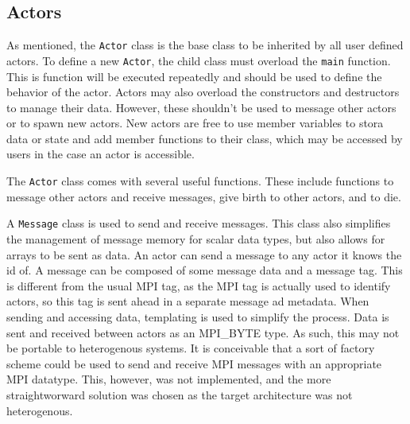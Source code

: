 \documentclass[12pt,a4paper]{article}
\newcommand{\term}[1]{\texttt{#1}}
\begin{document}
\subsection{Actors}
As mentioned, the \term{Actor} class is the base class
to be inherited by all user defined actors.
To define a new \term{Actor}, the child class must overload the
\term{main} function.
This is function will be executed repeatedly and should be used
to define the behavior of the actor.
Actors may also overload the constructors and destructors to manage
their data.
However, these shouldn't be used to message other actors
or to spawn new actors.
New actors are free to use member variables to stora data or state
and add member functions to their class, which may be accessed by users
in the case an actor is accessible.

The \term{Actor} class comes with several useful functions.
These include functions to message other actors and receive messages,
give birth to other actors, and to die.

A \term{Message} class is used to send and receive messages.
This class also simplifies the management of message memory for scalar
data types, but also allows for arrays to be sent as data.
An actor can send a message to any actor it knows the id of.
A message can be composed of some message data and a message tag.
This is different from the usual MPI tag, as the MPI tag is actually
used to identify actors, so this tag is sent ahead in a separate message
ad metadata.
When sending and accessing data, templating is used to simplify the process.
Data is sent and received between actors as an MPI\_BYTE type.
As such, this may not be portable to heterogenous systems.
It is conceivable that a sort of factory scheme could be used to
send and receive MPI messages with an appropriate MPI datatype.
This, however, was not implemented, and the more straightworward solution
was chosen as the target architecture was not heterogenous.
\end{document}
